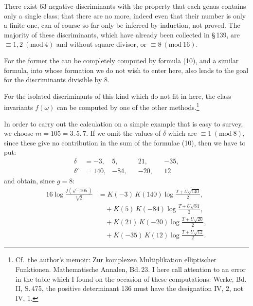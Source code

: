 There exist 63 negative discriminants with the property that each genus contains only a single class; that there are no more, indeed even that their number is only a finite one, can of course so far only be inferred by induction, not proved. The majority of these discriminants, which have already been collected in \S\,139, are $\equiv 1, 2\ (\mathrm{mod}\ 4)$ and without square divisor, or $\equiv 8\ (\mathrm{mod}\ 16)$.

For the former the  can be completely computed by formula (10), and a similar formula, into whose formation we do not wish to enter here, also leads to the goal for the discriminants divisible by 8.

For the isolated discriminants of this kind which do not fit in here, the class invariants $f(\omega)$ can be computed by one of the other methods.\footnote{Cf.\ the author's memoir: \glqq Zur komplexen Multiplikation elliptischer Funktionen\grqq{}. Mathematische Annalen, Bd.\,23. I here call attention to an error in the  table which I found on the occasion of these computations:  Werke, Bd.\,II, S.\,475, the positive determinant 136 must have the designation IV, 2, not IV, 1.}

In order to carry out the calculation on a simple example that is easy to survey, we choose $m=105=3.\,5.\,7$. If we omit the values of $\delta$ which are $\equiv 1\ (\mathrm{mod}\ 8)$, since these give no contribution in the sum of the formulae (10), then we have to put:
\[
\begin{aligned}
\delta &= -3, & 5, & & 21, & & -35, \\
\delta' &= 140, & -84, & & -20, & & 12
\end{aligned}
\]
and obtain, since $g=8$:
\[
\begin{aligned}
16\log\frac{f(\sqrt{-105})}{\sqrt[4]{2}} &= K(-3)\,K(140)\log\frac{T+U\sqrt{140}}{2}, \\
&\quad + K(5)\,K(-84)\log\frac{T+U\sqrt{84}}{2}, \\
&\quad + K(21)\,K(-20)\log\frac{T+U\sqrt{20}}{2}, \\
&\quad + K(-35)\,K(12)\log\frac{T+U\sqrt{12}}{2}.
\end{aligned}
\]
